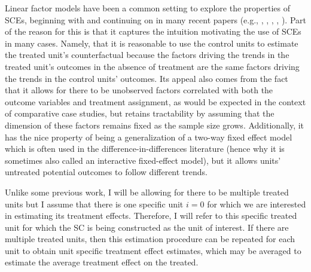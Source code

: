 \documentclass{article}
\begin{document}
Linear factor models have been a common setting to explore the properties of SCEs, beginning with \cite{Abadie2010} and continuing on in many recent papers (e.g., \cite{ImperfectFit}, \cite{covariates}, \cite{LargeSampleProperties}, \cite{SynthIntervention}, \cite{SDID}). Part of the reason for this is that it captures the intuition motivating the use of SCEs in many cases. Namely, that it is reasonable to use the control units to estimate the treated unit's counterfactual because the factors driving the trends in the treated unit's outcomes in the absence of treatment are the same factors driving the trends in the control units' outcomes. Its appeal also comes from the fact that it allows for there to be unobserved factors correlated with both the outcome variables and treatment assignment, as would be expected in the context of comparative case studies, but retains tractability by assuming that the dimension of these factors remains fixed as the sample size grows. Additionally, it has the nice property of being a generalization of a two-way fixed effect model which is often used in the difference-in-differences literature (hence why it is sometimes also called an interactive fixed-effect model), but it allows units' untreated potential outcomes to follow different trends.
\par 
 Unlike some previous work, I will be allowing for there to be multiple treated units but I assume that there is one specific unit $i = 0$ for which we are interested in estimating its treatment effects. Therefore, I will refer to this specific treated unit for which the SC is being constructed as the unit of interest. If there are multiple treated units, then this estimation procedure can be repeated for each unit to obtain unit specific treatment effect estimates, which may be averaged to estimate the average treatment effect on the treated. 
\end{document}
